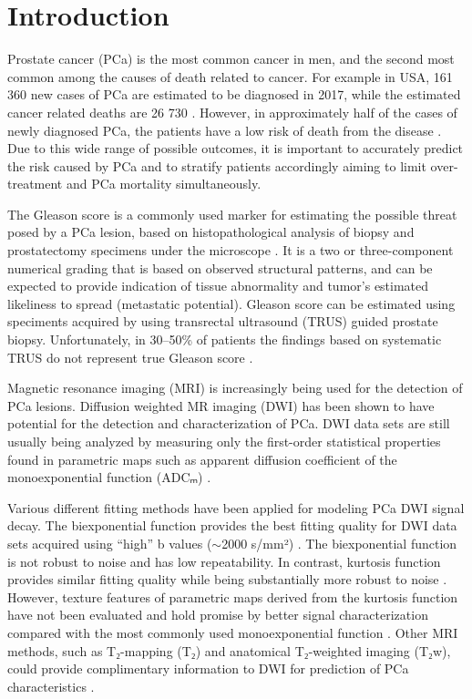 \section{Introduction}

Prostate cancer (PCa) is the most common cancer in men, and the second most
common among the causes of death related to cancer. For example in USA, 161 360
new cases of PCa are estimated to be diagnosed in 2017, while the estimated
cancer related deaths are 26 730 \citep{Siegel2017}. However, in approximately
half of the cases of newly diagnosed PCa, the patients have a low risk of death
from the disease \citep{Walsh2007, Draisma2003}. Due to this wide range of
possible outcomes, it is important to accurately predict the risk caused by
PCa and to stratify patients accordingly aiming to limit over-treatment and
PCa mortality simultaneously.

The Gleason score is a commonly used marker for estimating the possible threat
posed by a PCa lesion, based on histopathological analysis of biopsy and
prostatectomy specimens under the microscope \citep{Epstein2005}. It is a two or
three-component numerical grading that is based on observed structural patterns,
and can be expected to provide indication of tissue abnormality and tumor's
estimated likeliness to spread (metastatic potential). Gleason score can be
estimated using speciments acquired by using transrectal ultrasound (TRUS)
guided prostate biopsy. Unfortunately, in 30--50\% of patients the findings
based on systematic TRUS do not represent true Gleason score \citep{Nepple2009,
Steinberg1997, Rajinikanth2008}.

Magnetic resonance imaging (MRI) is increasingly being used for the detection of
PCa lesions. Diffusion weighted MR imaging (DWI) has been shown to have
potential for the detection and characterization of PCa. DWI data sets are
still usually being analyzed by measuring only the first-order statistical
properties found in parametric maps such as apparent diffusion coefficient of
the monoexponential function (ADCₘ) \citep{Turkbey2011, Toivonen2015,
Jambor2015Relaxation}.

Various different fitting methods have been applied for modeling PCa DWI signal
decay. The biexponential function \citep{Mulkern2006} provides the best fitting
quality for DWI data sets acquired using ``high'' b values ($\sim$2000 s/mm²)
\citep{Jambor2015Evaluation}. The biexponential function is not robust to
noise and has low repeatability. In contrast, kurtosis function
\citep{Jensen2005} provides similar fitting quality while being substantially
more robust to noise \citep{Jambor2015Evaluation}. However, texture
features of parametric maps derived from the kurtosis function have not been
evaluated and hold promise by better signal characterization compared with the
most commonly used monoexponential function \citep{Toivonen2015}. Other MRI
methods, such as T₂-mapping (T₂) and anatomical T₂-weighted imaging (T₂w), could
provide complimentary information to DWI for prediction of PCa characteristics
\citep{Jambor2015Relaxation}.


